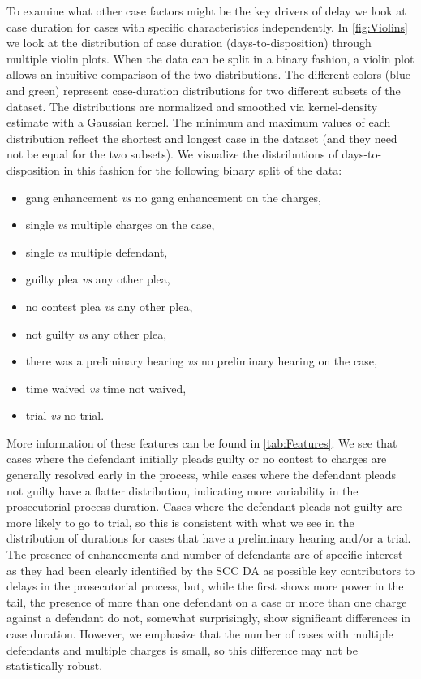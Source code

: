 To examine what other case factors might be the key drivers of delay
we look at case duration for cases with specific characteristics
independently. In \autoref{fig:Violins} we look at the distribution of
case duration (days-to-disposition) through multiple violin
plots. When the data can be split in a binary fashion, a violin plot
allows an intuitive comparison of the two distributions. The different
colors (blue and green) represent case-duration distributions for two
different subsets of the dataset. The distributions are normalized and
smoothed via kernel-density estimate with a Gaussian kernel. The
minimum and maximum values of each distribution reflect the shortest
and longest case in the dataset (and they need not be equal for the
two subsets).  We visualize the distributions of days-to-disposition
in this fashion for the following binary split of the data:
\begin{itemize}
\item gang enhancement \emph{vs} no gang enhancement on the charges,
\item single \emph{vs} multiple charges on the case,
\item single \emph{vs} multiple defendant,
\item guilty plea \emph{vs} any other plea,
\item no contest plea \emph{vs} any other plea,
\item not guilty \emph{vs} any other plea,
\item there was a preliminary hearing \emph{vs} no preliminary hearing on the case,
\item time waived \emph{vs}  time not waived,
\item trial \emph{vs} no trial.
\end{itemize}



More information of these features can be found in
\autoref{tab:Features}. We see that cases where the defendant
initially pleads guilty or no contest to charges are generally
resolved early in the process, while cases where the defendant pleads
not guilty have a flatter distribution, indicating more variability in
the prosecutorial process duration. Cases where the defendant pleads
not guilty are more likely to go to trial, so this is consistent with
what we see in the distribution of durations for cases that have
a preliminary hearing and/or a trial.  The presence of enhancements and
number of defendants are of specific interest as they had been clearly
identified by the SCC DA as possible key contributors to delays in the
prosecutorial process, but, while the first shows more power in the
tail, the presence of more than one defendant on a case or more than
one charge against a defendant do not, somewhat surprisingly, show
significant differences in case duration. However, we emphasize that
the number of cases with multiple defendants and multiple charges is
small, so this difference may not be statistically robust.

